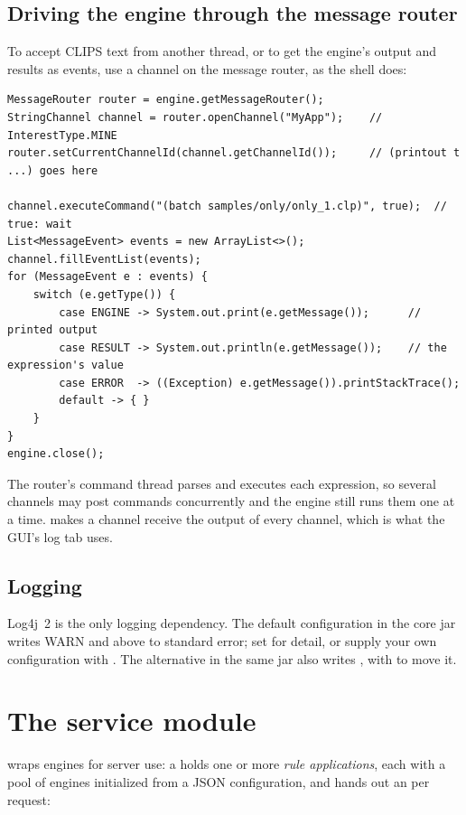 \subsection{Driving the engine through the message router}
\label{sec:router}

To accept CLIPS text from another thread, or to get the engine's output
and results as events, use a channel on the message router, as the shell
does:

\begin{lstlisting}[style=java]
MessageRouter router = engine.getMessageRouter();
StringChannel channel = router.openChannel("MyApp");    // InterestType.MINE
router.setCurrentChannelId(channel.getChannelId());     // (printout t ...) goes here

channel.executeCommand("(batch samples/only/only_1.clp)", true);  // true: wait
List<MessageEvent> events = new ArrayList<>();
channel.fillEventList(events);
for (MessageEvent e : events) {
    switch (e.getType()) {
        case ENGINE -> System.out.print(e.getMessage());      // printed output
        case RESULT -> System.out.println(e.getMessage());    // the expression's value
        case ERROR  -> ((Exception) e.getMessage()).printStackTrace();
        default -> { }
    }
}
engine.close();
\end{lstlisting}

The router's command thread parses and executes each expression, so
several channels may post commands concurrently and the engine still
runs them one at a time.  makes a channel receive
the output of every channel, which is what the GUI's log tab uses.

\subsection{Logging}

Log4j~2 is the only logging dependency. The default configuration in
the core jar writes WARN and above to standard error; set
 for detail, or supply your own
configuration with . The alternative
 in the same jar also writes
, with  to move it.

\section{The service module}

 wraps engines for server use: a
 holds one or more \emph{rule applications}, each with a
pool of engines initialized from a JSON configuration, and hands out an
 per request:

